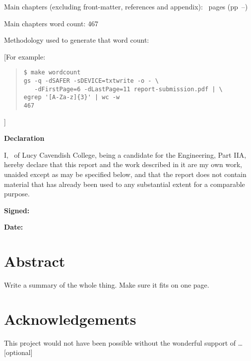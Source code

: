 \documentclass[12pt,a4paper,twoside]{report}
\newif\ifsubmission %
\newcommand{\college}{Lucy Cavendish College}
\newcommand{\course}{Engineering, Part IIA}
\begin{document}
\begin{sffamily}
Main chapters (excluding front-matter, references and appendix):
\contentpages~pages
(pp~\pageref{firstcontentpage}--\pageref{lastcontentpage})

Main chapters word count: 467

Methodology used to generate that word count:

[For example:

\begin{quote}
\begin{verbatim}
$ make wordcount
gs -q -dSAFER -sDEVICE=txtwrite -o - \
   -dFirstPage=6 -dLastPage=11 report-submission.pdf | \
egrep '[A-Za-z]{3}' | wc -w
467
\end{verbatim}
\end{quote}

]

\end{sffamily}

\vspace{\fill}
\onehalfspacing
\ifsubmission\else\makeatletter
\textbf{\Huge Declaration}
\vspace{40pt}

I, \@author\ of \college, being a candidate for the \course, hereby
declare that this report and the work described in it are my own work,
unaided except as may be specified below, and that the report does not
contain material that has already been used to any substantial extent
for a comparable purpose.


\bigskip 
\textbf{Signed:}

\bigskip
\textbf{Date:}
\vspace{\fill}
\makeatother\fi

\chapter*{Abstract}

Write a summary of the whole thing. Make sure it fits on one page.

\ifsubmission\else

\chapter*{Acknowledgements}

This project would not have been possible without the wonderful
support of \ldots [optional]
\end{document}
